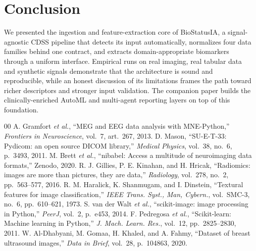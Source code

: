 \documentclass[conference]{IEEEtran}
\begin{document}
\section{Conclusion}
We presented the ingestion and feature-extraction core of BioStatusIA, a
signal-agnostic CDSS pipeline that detects its input automatically, normalizes
four data families behind one contract, and extracts domain-appropriate
biomarkers through a uniform interface. Empirical runs on real imaging, real
tabular data and synthetic signals demonstrate that the architecture is sound
and reproducible, while an honest discussion of its limitations frames the path
toward richer descriptors and stronger input validation. The companion paper
builds the clinically-enriched AutoML and multi-agent reporting layers on top of
this foundation.

\begin{thebibliography}{00}
 A. Gramfort \emph{et al.}, ``MEG and EEG data analysis
with MNE-Python,'' \emph{Frontiers in Neuroscience}, vol.~7, art.~267, 2013.
 D. Mason, ``SU-E-T-33: Pydicom: an open source DICOM
library,'' \emph{Medical Physics}, vol.~38, no.~6, p.~3493, 2011.
 M. Brett \emph{et al.}, ``nibabel: Access a
multitude of neuroimaging data formats,'' Zenodo, 2020.
 R. J. Gillies, P. E. Kinahan, and H. Hricak,
``Radiomics: images are more than pictures, they are data,'' \emph{Radiology},
vol.~278, no.~2, pp.~563--577, 2016.
 R. M. Haralick, K. Shanmugam, and I. Dinstein,
``Textural features for image classification,'' \emph{IEEE Trans. Syst., Man,
Cybern.}, vol.~SMC-3, no.~6, pp.~610--621, 1973.
 S. van der Walt \emph{et al.},
``scikit-image: image processing in Python,'' \emph{PeerJ}, vol.~2, p.~e453,
2014.
 F. Pedregosa \emph{et al.}, ``Scikit-learn:
Machine learning in Python,'' \emph{J. Mach. Learn. Res.}, vol.~12,
pp.~2825--2830, 2011.
 W. Al-Dhabyani, M. Gomaa, H. Khaled, and A. Fahmy,
``Dataset of breast ultrasound images,'' \emph{Data in Brief}, vol.~28,
p.~104863, 2020.
\end{thebibliography}
\end{document}
